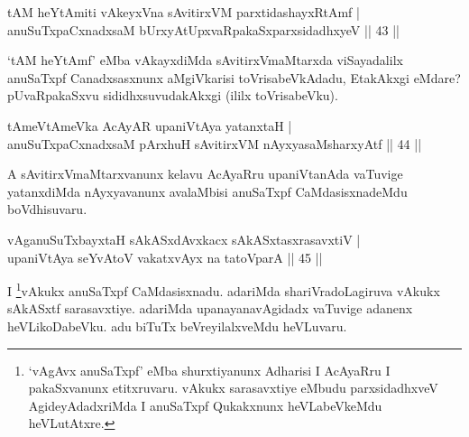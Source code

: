 
\begin{shl}
tAM heYtAmiti vAkeyxVna sAvitirxVM parxtidashayxRtAmf | \\
anuSuTxpaCxnadxsaM bUrxyAtUpxvaRpakaSxparxsidadhxyeV \hfill ||  43 || 
\end{shl}

\begin{artha} 
`tAM heYtAmf' eMba vAkayxdiMda sAvitirxVmaMtarxda viSayadalilx 
anuSaTxpf Canadxsasxnunx aMgiVkarisi toVrisabeVkAdadu, EtakAkxgi eMdare? pUvaRpakaSxvu sididhxsuvudakAkxgi (ililx toVrisabeVku).
\end{artha}


\begin{shl}
tAmeVtAmeVka AcAyAR upaniVtAya yatanxtaH | \\
\footnotemark[1]{}anuSuTxpaCxnadxsaM pArxhuH sAvitirxVM nAyxyasaMsharxyAtf \hfill ||  44 || 
\end{shl}

\begin{artha} 
A sAvitirxVmaMtarxvanunx kelavu AcAyaRru upaniVtanAda vaTuvige 
yatanxdiMda nAyxyavanunx avalaMbisi anuSaTxpf CaMdasisxnadeMdu 
boVdhisuvaru.
\end{artha}


\begin{shl}
vAganuSuTxbayxtaH sAkASxdAvxkacx sAkASxtasxrasavxtiV | \\
upaniVtAya seYvAtoV vakatxvAyx na tatoV\s parA \hfill ||  45 || 
\end{shl}

\begin{artha} 
I \footnote[1]{`vAgAvx anuSaTxpf' eMba shurxtiyanunx Adharisi I 
AcAyaRru I pakaSxvanunx etitxruvaru. vAkukx sarasavxtiye eMbudu 
parxsidadhxveV AgideyAdadxriMda I anuSaTxpf Qukakxnunx heVLabeVkeMdu 
heVLutAtxre.}vAkukx anuSaTxpf CaMdasisxnadu. adariMda 
shariVradoLagiruva vAkukx sAkASxtf sarasavxtiye. adariMda 
upanayanavAgidadx vaTuvige adanenx heVLikoDabeVku. adu biTuTx 
beVreyilalxveMdu heVLuvaru.
\end{artha}

